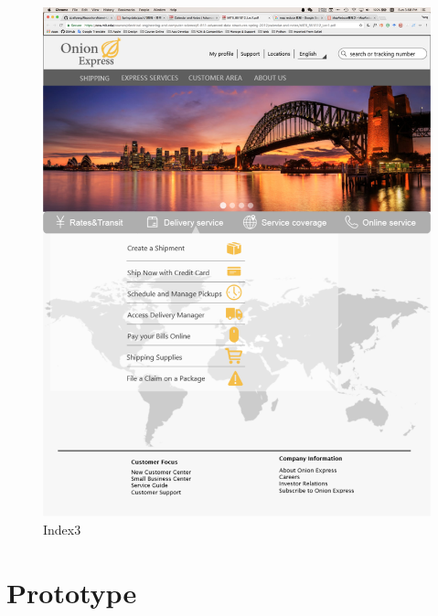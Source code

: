 \documentclass[12pt]{scrreprt}
\begin{document}
\begin{figure}[htbp]
  \centering\includegraphics[width=5in]{DocumentRes/index3.png}
  \caption{Index3}
\end{figure}

\chapter{Prototype}
\end{document}
